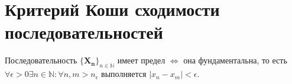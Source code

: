 \section{Критерий Коши сходимости последовательностей}

\begin{theorem}
	Последовательность $\{\mathbf{X_n}\}_{n \in \mathbb{N}}$ имеет предел $\Leftrightarrow$ она фундаментальна, то есть $\forall \epsilon > 0 \exists n \in \mathbb{N}: \forall n, m > n_\epsilon$ выполняется $|x_n - x_m| < \epsilon$. 
\end{theorem}